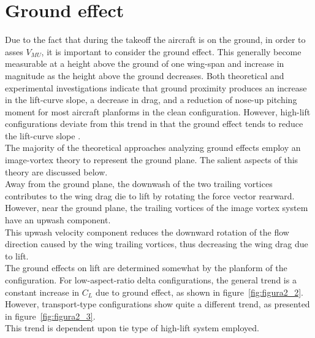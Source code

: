 \section{Ground effect}
Due to the fact that during the takeoff the aircraft is on the ground, in order to asses $V_{MU}$,  it is important to consider the ground effect. This generally become measurable at a height above the ground of one wing-span and increase in magnitude as the height above the ground decreases. Both theoretical and
experimental investigations indicate that ground proximity produces an increase in the lift-curve
slope, a decrease in drag, and a reduction of nose-up pitching moment for most aircraft planforms in
the clean configuration. However, high-lift configurations deviate from this trend in that the ground
effect tends to reduce the lift-curve slope \cite{Datcom}.\\

The majority of the theoretical approaches analyzing ground effects employ an image-vortex theory
to represent the ground plane. The salient aspects of this theory are discussed below.\\

Away from the ground plane, the downwash of the two trailing vortices contributes to the wing
drag die to lift by rotating the force vector rearward.\\
However, near the ground plane, the trailing vortices of the image vortex system have an upwash component.\\

This upwash velocity component reduces the downward rotation of the flow direction caused by the wing trailing vortices, thus decreasing the wing drag due to lift.\\

The ground effects on lift are determined somewhat by the planform of the configuration. For
low-aspect-ratio delta configurations, the general trend is a constant increase in $C_L$ due to ground
effect, as shown in figure~\ref{fig:figura2_2}.
However, transport-type configurations show quite a different trend, as presented in figure~\ref{fig:figura2_3}.\\
This trend is dependent upon tie type of high-lift system employed.

